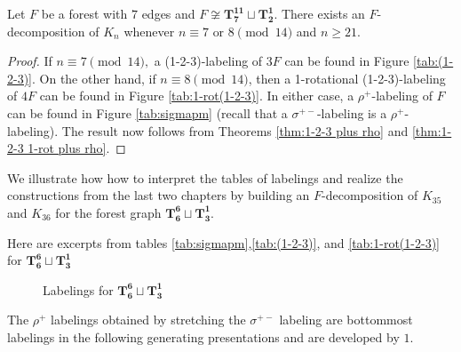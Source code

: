 \begin{thm}\label{thm:7 or 8 mod 14}
    Let $F$ be a forest with $7$ edges and $F \not \cong \mathbf{T_{7}^{11}}\sqcup\mathbf{T_{2}^{1}}$. There exists an $F$-decomposition of $K_n$ whenever $n \equiv 7 \textrm{ or } 8 \pmod{14}$ and $n \geq 21.$
\end{thm}
\begin{proof}
    If $n \equiv 7 \pmod{14},$ a (1-2-3)-labeling of $3F$ can be found in Figure \ref{tab:(1-2-3)}. On the other hand, if $n \equiv 8 \pmod{14}$, then a 1-rotational (1-2-3)-labeling of $4F$ can be found in Figure \ref{tab:1-rot(1-2-3)}. In either case, a $\rho^{+}$-labeling of $F$ can be found in Figure \ref{tab:sigmapm} (recall that a $\sigma^{+-}$-labeling is a $\rho^{+}$-labeling). The result now follows from Theorems \ref{thm:1-2-3 plus rho} and \ref{thm:1-2-3 1-rot plus rho}.
\end{proof}
We illustrate how how to interpret the tables of labelings and realize the constructions from the last two chapters by building an $F$-decomposition of $K_{35}$ and $K_{36}$ for the forest graph $\mathbf{T_{6}^{6}} \sqcup \mathbf{T_{3}^{1}}$.\newline
\begin{example}
\noindent Here are excerpts from tables \ref{tab:sigmapm},\ref{tab:(1-2-3)}, and \ref{tab:1-rot(1-2-3)} for $\mathbf{T_{6}^{6}} \sqcup \mathbf{T_{3}^{1}}$

\begin{figure}[H]
\centering
        \scalebox{0.6}{}
        \caption{Labelings for $\mathbf{T_{6}^{6}} \sqcup \mathbf{T_{3}^{1}}$}
        \label{fig:example chart}
\end{figure}
\newpage
The $\rho^{+}$ labelings obtained by stretching the $\sigma^{+-}$ labeling are bottommost labelings in the following generating presentations and are developed by $1$.
\end{example}

        
        
